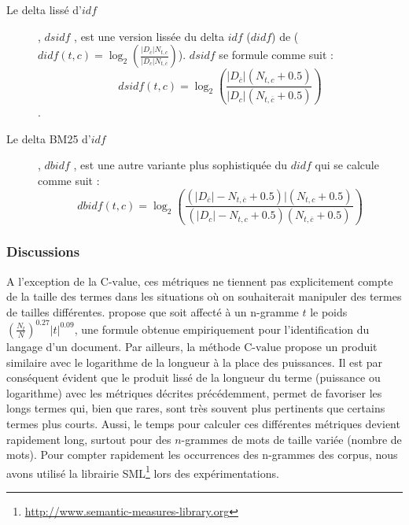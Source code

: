 \begin{description}
 \item[Le \og delta lissé d'$idf$\fg{}], $dsidf$ \citep{paltoglou2010dsidfANDdbidf}, est une version lissée du delta $idf$ ($didf$) de \citet{martineau2009didf} ($didf(t,c)=\log_2\left(\frac{\vert D_{\overline{c}} \vert N_{t,c}}{\vert D_c \vert N_{t,\overline{c}}}\right)$). $dsidf$ se formule comme suit :
 \[dsidf(t,c) = \log_2\left(\frac{\vert D_{\overline{c}} \vert (N_{t,c} + 0.5)}{\vert D_c \vert (N_{t,\overline{c}} + 0.5)}\right)\].
 \item[Le delta BM25 d'$idf$], $dbidf$ \citep{paltoglou2010dsidfANDdbidf}, est une autre variante plus sophistiquée du $didf$ qui se calcule comme suit :
 \[dbidf(t,c) = \log_2\left(\frac{( \vert D_{\overline{c}} \vert - N_{t,\overline{c}} + 0.5) \vert (N_{t,c} + 0.5)}{(\vert D_c \vert - N_{t,c} + 0.5) (N_{t,\overline{c}} + 0.5)}\right)\]
\end{description}

\subsubsection{Discussions}
A l'exception de la $\text{C-value}$, ces métriques ne tiennent pas explicitement compte de la taille des termes dans les situations où on souhaiterait manipuler des termes de tailles différentes. \citet{brown2013ngram1100languages} propose que soit affecté à un n-gramme $t$ le poids $\left(\frac{N_t}{N}\right)^{0.27} \vert t \vert^{0.09}$, une formule obtenue empiriquement pour l'identification du langage d'un document. Par ailleurs, la méthode $\text{C-value}$ \citep{frantzi2000CValueNCValue} propose un produit similaire avec le logarithme de la longueur à la place des puissances. Il est par conséquent évident que le produit lissé de la longueur du terme (puissance ou logarithme) avec les métriques décrites précédemment, permet de favoriser les longs termes qui, bien que rares, sont très souvent plus pertinents que certains termes plus courts. Aussi, le temps pour calculer ces différentes métriques devient rapidement long, surtout pour des $n$-grammes de mots de taille variée (nombre de mots). Pour compter rapidement les occurrences des n-grammes des corpus, nous avons utilisé la librairie SML\footnote{\url{http://www.semantic-measures-library.org}} \citep{harispe2013semlib} lors des expérimentations.


